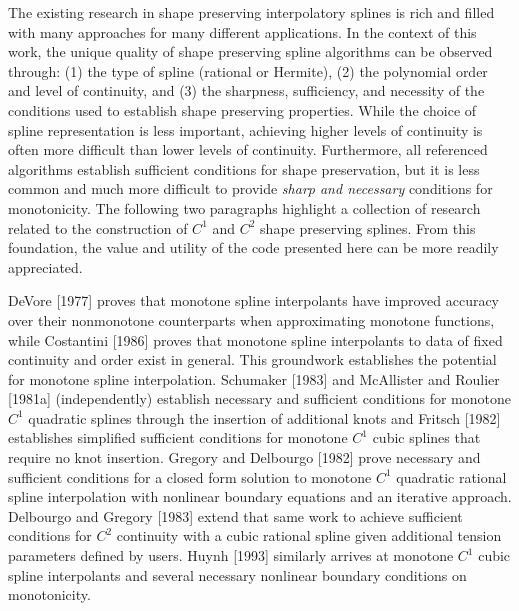 The existing research in shape preserving interpolatory splines is
rich and filled with many approaches for many different
applications. In the context of this work, the unique quality of shape
preserving spline algorithms can be observed through: (1) the type of
spline (rational or Hermite), (2) the polynomial order and level of
continuity, and (3) the sharpness, sufficiency, and necessity of the
conditions used to establish shape preserving properties. While the
choice of spline representation is less important, achieving higher
levels of continuity is often more difficult than lower levels of
continuity. Furthermore, all referenced algorithms establish
sufficient conditions for shape preservation, but it is less common
and much more difficult to provide {\it sharp and necessary}
conditions for monotonicity. The following two paragraphs highlight a
collection of research related to the construction of $C^1$ and $C^2$
shape preserving splines. From this foundation, the value and utility
of the code presented here can be more readily appreciated.

DeVore [1977] proves that monotone spline interpolants have improved
accuracy over their nonmonotone counterparts when approximating
monotone functions, while Costantini [1986] proves that monotone
spline interpolants to data of fixed continuity and order exist in
general. This groundwork establishes the potential for monotone spline
interpolation. Schumaker [1983] and McAllister and Roulier [1981a]
(independently) establish necessary and sufficient conditions for
monotone $C^1$ quadratic splines through the insertion of additional
knots and Fritsch [1982] establishes simplified sufficient conditions
for monotone $C^1$ cubic splines that require no knot insertion.
Gregory and Delbourgo [1982] prove necessary and sufficient conditions
for a closed form solution to monotone $C^1$ quadratic rational spline
interpolation with nonlinear boundary equations and an iterative
approach. Delbourgo and Gregory [1983] extend that same work to
achieve sufficient conditions for $C^2$ continuity with a cubic
rational spline given additional tension parameters defined by
users. Huynh [1993] similarly arrives at monotone $C^1$ cubic spline
interpolants and several necessary nonlinear boundary conditions on
monotonicity.

